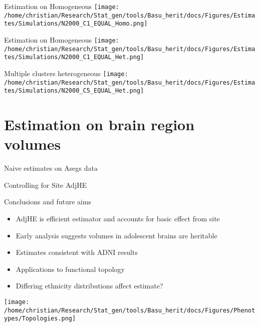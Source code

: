 \documentclass[
  ignorenonframetext,
]{beamer}
\begin{document}
\begin{frame}{Estimation on Homogeneous}
\centering
 \texttt{[image: /home/christian/Research/Stat\_gen/tools/Basu\_herit/docs/Figures/Estimates/Simulations/N2000\_C1\_EQUAL\_Homo.png]}
\end{frame}


\begin{frame}{Estimation on Homogeneous}
\centering
 \texttt{[image: /home/christian/Research/Stat\_gen/tools/Basu\_herit/docs/Figures/Estimates/Simulations/N2000\_C1\_EQUAL\_Het.png]}
\end{frame}

\begin{frame}{Multiple clusters heterogeneous}
\centering
 \texttt{[image: /home/christian/Research/Stat\_gen/tools/Basu\_herit/docs/Figures/Estimates/Simulations/N2000\_C5\_EQUAL\_Het.png]}
\end{frame}



\section{Estimation on brain region volumes}
\begin{frame}{Naive estimates on Asegs data}
\end{frame}


\begin{frame}{Controlling for Site AdjHE}

\end{frame}






\begin{frame}{Conclusions and future aims}
\begin{itemize}
	\item AdjHE is efficient estimator and accounts for basic effect from site
	\item Early analysis suggests volumes in adolescent brains are heritable
	\item Estimates consistent with ADNI results
	\item Applications to functional topology
	\item Differing ethnicity distributions affect estimate?
\end{itemize}
\centering
\texttt{[image: /home/christian/Research/Stat\_gen/tools/Basu\_herit/docs/Figures/Phenotypes/Topologies.png]}
\end{frame}
\end{document}

